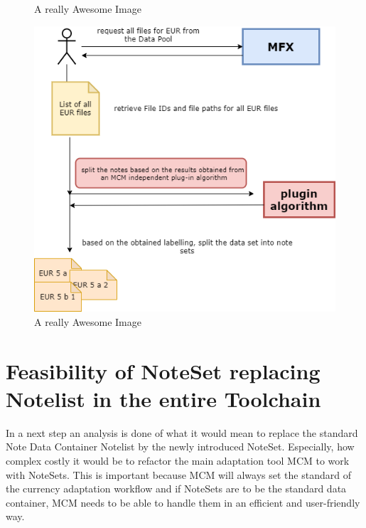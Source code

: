 \begin{figure}[!htb]
  \caption{A really Awesome Image}\label{fig:awesome_image2}
\endminipage\hfill
{}%
  \includegraphics[width=\linewidth]{images/label_plugin_approach.png}
  \caption{A really Awesome Image}\label{fig:awesome_image3}
\endminipage
\end{figure}

\section{Feasibility of NoteSet replacing Notelist in the entire Toolchain}
In a next step an analysis is done of what it would mean to replace the standard Note Data Container Notelist by the newly introduced NoteSet. Especially, how complex costly it would be to refactor the main adaptation tool MCM to work with NoteSets. This is important because MCM will always set the standard of the currency adaptation workflow and if NoteSets are to be the standard data container, MCM needs to be able to handle them in an efficient and user-friendly way.